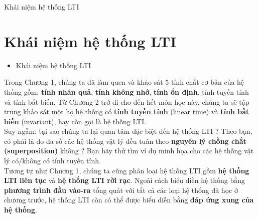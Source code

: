 \documentclass[8pt]{beamer}
\begin{document}
\begin{frame}{Khái niệm hệ thống LTI}
\section{Khái niệm hệ thống LTI}
\begin{itemize}
	\item Khái niệm hệ thống LTI
\end{itemize}
Trong \alert{Chương 1}, chúng ta đã làm quen và khảo sát $5$ tính chất cơ bản của hệ thống gồm: \textbf{tính nhân quả}, \textbf{tính không nhớ}, \textbf{tính ổn định}, \alert{tính tuyến tính} và \alert{tính bất biến}. Từ \alert{Chương 2} trở đi cho đến hết môn học này, chúng ta sẽ tập trung khảo sát một họ hệ thống có \textbf{tính tuyến tính} (linear time) và \textbf{tính bất biến} (invariant), hay còn gọi là \alert{hệ thống LTI}.
\\ Suy ngẫm: tại sao chúng ta lại quan tâm đặc biệt đến hệ thống LTI ? Theo bạn, có phải là do đa số các hệ thống vật lý đều tuân theo \textbf{nguyên lý chồng chất (superposition)} không ? Bạn hãy thử tìm ví dụ minh họa cho các hệ thống vật lý có/không có tính tuyến tính.
\\ Tương tự như \alert{Chương 1}, chúng ta cũng phân loại hệ thống LTI gồm \textbf{hệ thống LTI liên tục} và \textbf{hệ thống LTI rời rạc}. Ngoài cách biểu diễn hệ thống bằng \textbf{phương trình đầu vào-ra} tổng quát với tất cả các loại hệ thống đã học ở chương trước, hệ thống LTI còn có thể được biểu diễn bằng \textbf{đáp ứng xung của hệ thống}.
\end{frame}
\end{document}
